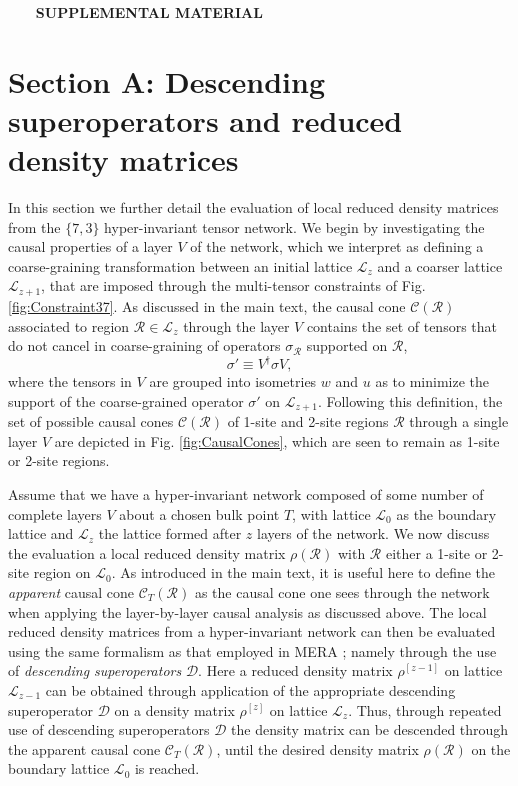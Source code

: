 \documentclass[aps,prl,twocolumn,showpacs,superscriptaddress,floatfix,10pt]{revtex4-1}
\def\D{{\mathcal D}}
\def\L{{\mathcal L}}
\def\C{{\mathcal C}}
\def\R{{\mathcal R}}
\begin{document}
\newpage

\textbf{$~~~~~~~~~$SUPPLEMENTAL MATERIAL}

\section{Section A: Descending superoperators and reduced density matrices}
In this section we further detail the evaluation of local reduced density matrices from the $\{7,3 \}$ hyper-invariant tensor network. We begin by investigating the causal properties of a layer $V$ of the network, which we interpret as defining a coarse-graining transformation between an initial lattice $\L_z$ and a coarser lattice $\L_{z+1}$, that are imposed through the multi-tensor constraints of Fig. \ref{fig:Constraint37}. As discussed in the main text, the causal cone $\C(\R)$ associated to region $\R \in \L_z$ through the layer $V$ contains the set of tensors that do not cancel in coarse-graining of operators $\sigma_{\R}$ supported on $\R$, 
\begin{equation}
{\sigma'} \equiv {V^\dag } \sigma V,
\end{equation}
where the tensors in $V$ are grouped into isometries $w$ and $u$ as to minimize the support of the coarse-grained operator ${\sigma'}$ on $\L_{z+1}$. Following this definition, the set of possible causal cones $\C(\R)$ of 1-site and 2-site regions $\R$ through a single layer $V$ are depicted in Fig. \ref{fig:CausalCones}, which are seen to remain as 1-site or 2-site regions.


Assume that we have a hyper-invariant network composed of some number of complete layers $V$ about a chosen bulk point $T$, with lattice $\L_0$ as the boundary lattice and $\L_z$ the lattice formed after $z$ layers of the network. We now discuss the evaluation a local reduced density matrix $\rho(\R)$ with $\R$ either a 1-site or 2-site region on $\L_0$. As introduced in the main text, it is useful here to define the \emph{apparent} causal cone $\C_T(\R)$ as the causal cone one sees through the network when applying the layer-by-layer causal analysis as discussed above. The local reduced density matrices from a hyper-invariant network can then be evaluated using the same formalism as that employed in MERA \cite{Evenbly09}; namely through the use of \emph{descending superoperators} $\D$. Here a reduced density matrix $\rho^{[z-1]}$ on lattice $\L_{z-1}$ can be obtained through application of the appropriate descending superoperator $\D$ on a density matrix $\rho^{[z]}$ on lattice $\L_{z}$. %
Thus, through repeated use of descending superoperators $\D$ the density matrix can be descended through the apparent causal cone $\C_T(\R)$, until the desired density matrix $\rho(\R)$ on the boundary lattice $\L_0$ is reached.
\end{document}
